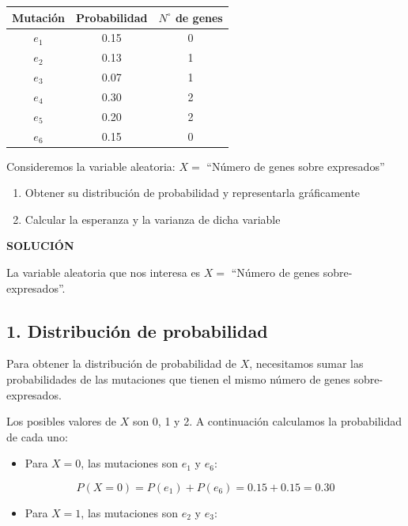 \documentclass[
]{article}
\providecommand{\tightlist}{%
  \setlength{\itemsep}{0pt}\setlength{\parskip}{0pt}}
\begin{document}
\begin{longtable}[]{@{}ccc@{}}
\toprule\noalign{}
Mutación & Probabilidad & \(N^{\circ}\) de genes \\
\midrule\noalign{}
\endhead
\bottomrule\noalign{}
\endlastfoot
\(e_{1}\) & 0.15 & 0 \\
\(e_{2}\) & 0.13 & 1 \\
\(e_{3}\) & 0.07 & 1 \\
\(e_{4}\) & 0.30 & 2 \\
\(e_{5}\) & 0.20 & 2 \\
\(e_{6}\) & 0.15 & 0 \\
\end{longtable}

Consideremos la variable aleatoria: \(X=\) ``Número de genes sobre expresados''

\begin{enumerate}
\def\labelenumi{\arabic{enumi}.}
\item
  Obtener su distribución de probabilidad y representarla gráficamente
\item
  Calcular la esperanza y la varianza de dicha variable
\end{enumerate}

\textbf{SOLUCIÓN}

La variable aleatoria que nos interesa es \(X=\) ``Número de genes sobre-expresados''.

\subsection{1. Distribución de probabilidad}\label{distribuciuxf3n-de-probabilidad}

Para obtener la distribución de probabilidad de \(X\), necesitamos sumar las probabilidades de las mutaciones que tienen el mismo número de genes sobre-expresados.

Los posibles valores de \(X\) son 0, 1 y 2. A continuación calculamos la probabilidad de cada uno:

\begin{itemize}
\tightlist
\item
  Para \(X = 0\), las mutaciones son \(e_1\) y \(e_6\):
\end{itemize}

\[
P(X = 0) = P(e_1) + P(e_6) = 0.15 + 0.15 = 0.30
\]

\begin{itemize}
\tightlist
\item
  Para \(X = 1\), las mutaciones son \(e_2\) y \(e_3\):
\end{itemize}
\end{document}
